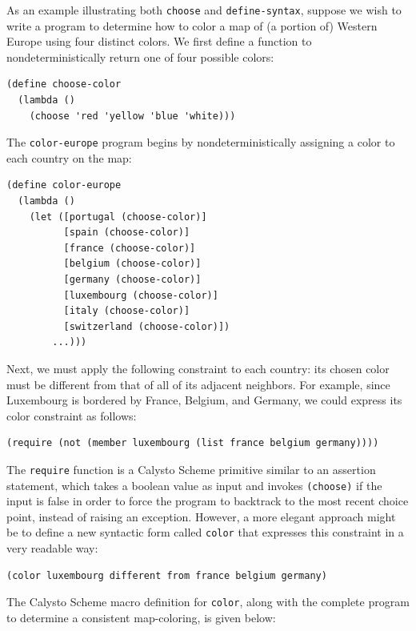 \documentclass[acmsmall,screen,authorversion]{acmart}
\begin{document}
As an example illustrating both \texttt{choose} and
\texttt{define-syntax}, suppose we wish to write a program to determine how to
color a map of (a portion of) Western Europe using four distinct colors.  We
first define a function to nondeterministically return one of four possible
colors:

{\small
\begin{verbatim}
(define choose-color
  (lambda ()
    (choose 'red 'yellow 'blue 'white)))
\end{verbatim}
}

\noindent
The \texttt{color-europe} program begins by nondeterministically assigning a
color to each country on the map:\\

{\small
\begin{verbatim}
(define color-europe
  (lambda ()
    (let ([portugal (choose-color)]
          [spain (choose-color)]
          [france (choose-color)]
          [belgium (choose-color)]
          [germany (choose-color)]
          [luxembourg (choose-color)]
          [italy (choose-color)]
          [switzerland (choose-color)])
        ...)))
\end{verbatim}
}

\noindent
Next, we must apply the following constraint to each country: its chosen color
must be different from that of all of its adjacent neighbors.  For example,
since Luxembourg is bordered by France, Belgium, and Germany, we could express
its color constraint as follows:

{\small
\begin{verbatim}
(require (not (member luxembourg (list france belgium germany))))
\end{verbatim}
}

\noindent
The \texttt{require} function is a Calysto Scheme primitive similar to an
assertion statement, which takes a boolean value as input and invokes
\texttt{(choose)} if the input is false in order to force the program to
backtrack to the most recent choice point, instead of raising an exception.
However, a more elegant approach might be to define a new syntactic form called
\texttt{color} that expresses this constraint in a very readable way:

{\small
\begin{verbatim}
(color luxembourg different from france belgium germany)
\end{verbatim}
}

\noindent
The Calysto Scheme macro definition for \texttt{color}, along with the complete
program to determine a consistent map-coloring, is given below:
\end{document}
